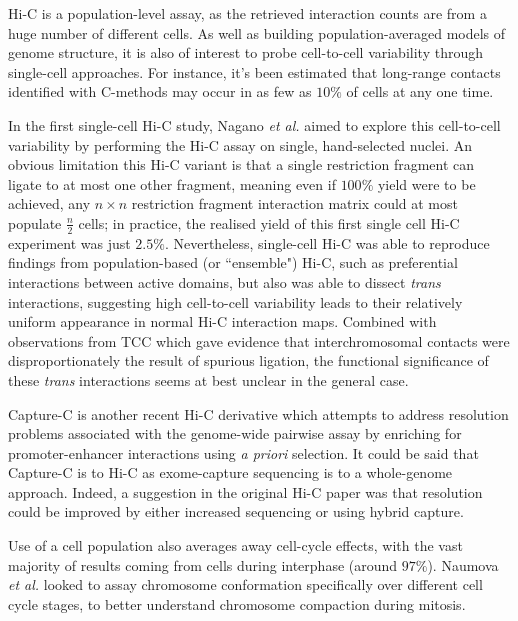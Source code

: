 \documentclass[a4paper,11pt,oneside]{book}
\begin{document}
Hi-C is a population-level assay, as the retrieved interaction counts are from a huge number of different cells. As well as building population-averaged models of genome structure, it is also of interest to probe cell-to-cell variability through single-cell approaches. For instance, it's been estimated that long-range contacts identified with C-methods may occur in as few as $10\%$ of cells at any one time.\cite{VanSteensel2010} 

In the first single-cell Hi-C study, Nagano \emph{et al.}\cite{Nagano2013} aimed to explore this cell-to-cell variability by performing the Hi-C assay on single, hand-selected nuclei. An obvious limitation this Hi-C variant is that a single restriction fragment can ligate to at most one other fragment, meaning even if $100\%$ yield were to be achieved, any $n \times n$ restriction fragment interaction matrix could at most populate $\frac{n}{2}$ cells; in practice, the realised yield of this first single cell Hi-C experiment was just $2.5\%$.\cite{Nagano2013} Nevertheless, single-cell Hi-C was able to reproduce findings from population-based (or ``ensemble") Hi-C, such as preferential interactions between active domains, but also was able to dissect \emph{trans} interactions, suggesting high cell-to-cell variability leads to their relatively uniform appearance in normal Hi-C interaction maps.\cite{Nagano2013} Combined with observations from TCC which gave evidence that interchromosomal contacts were disproportionately the result of spurious ligation,\cite{Kalhor2012} the functional significance of these \emph{trans} interactions seems at best unclear in the general case.

Capture-C is another recent Hi-C derivative which attempts to address resolution problems associated with the genome-wide pairwise assay by enriching for promoter-enhancer interactions using \emph{a priori} selection.\cite{Mifsud2015} It could be said that Capture-C is to Hi-C as exome-capture sequencing is to a whole-genome approach. Indeed, a suggestion in the original Hi-C paper was that resolution could be improved by either increased sequencing or using hybrid capture.\cite{Lieberman2009}

Use of a cell population also averages away cell-cycle effects, with the vast majority of results coming from cells during interphase (around $97\%$\cite{Naumova2013}). Naumova \emph{et al.}\cite{Naumova2013} looked to assay chromosome conformation specifically over different cell cycle stages, to better understand chromosome compaction during mitosis.
\end{document}
